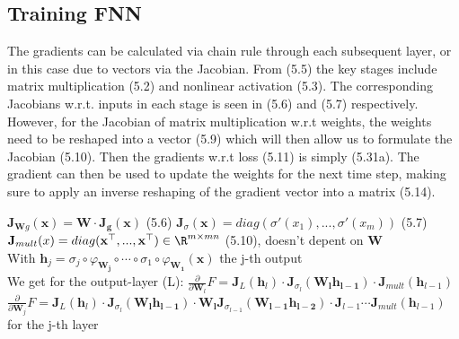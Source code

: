 \documentclass[english]{latex4ei/latex4ei_sheet}
\begin{document}
\begin{sectionbox}
\subsection{Training FNN}
The gradients can be calculated via chain rule through each subsequent layer, or in this case due to vectors via the Jacobian. From (5.5) the key stages include matrix multiplication (5.2) and nonlinear activation (5.3). The corresponding Jacobians w.r.t. inputs in each stage is seen in (5.6) and (5.7) respectively. However, for the Jacobian of matrix multiplication w.r.t weights, the weights need to be reshaped into a vector (5.9) which will then allow us to formulate the Jacobian (5.10). Then the gradients w.r.t loss (5.11) is simply (5.31a). The gradient can then be used to update the weights for the next time step, making sure to apply an inverse reshaping of the gradient vector into a matrix (5.14).
\begin{emphbox}
    $\mathbf{J}_{\mathbf{W} g}(\mathbf{x})=\mathbf{W\cdot J_g}(\mathbf{x})$ (5.6)
    $\mathbf{J}_{\sigma}(\mathbf{x})=diag(\sigma'(x_1),...,\sigma'(x_m))$
    (5.7)
$\mathbf{J}_{mult}(x)=diag(\mathbf{x}^{\top},...,\mathbf{x}^{\top})\in\R^{m\times mn}$ (5.10), doesn't depent on $\mathbf{W}$\\
With $\mathbf{h}_j=\sigma_j\circ\varphi_\mathbf{W_j}\circ\cdots\circ\sigma_1\circ\varphi_{\mathbf{W_1}}(\mathbf{x})$ the j-th output\\
We get for the output-layer (L): $\frac{\partial}{\partial\mathbf{W}_l}F=\mathbf{J}_L(\mathbf{h}_l)\cdot\mathbf{J}_{\sigma_l}(\mathbf{W_lh_{l-1}})\cdot\mathbf{J}_{mult}(\mathbf{h}_{l-1})$\\

$\frac{\partial}{\partial\mathbf{W}_j}F=\mathbf{J}_L(\mathbf{h}_l)\cdot\mathbf{J}_{\sigma_l}(\mathbf{W_lh_{l-1}})\cdot\mathbf{W_l}\mathbf{J}_{\sigma_{l-1}}(\mathbf{W_{l-1}h_{l-2}})\cdot\mathbf{J}_{l-1}\cdots \mathbf{J}_{mult}(\mathbf{h}_{l-1})$ for the j-th layer
\end{emphbox}


\end{sectionbox}
\end{document}

